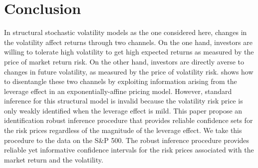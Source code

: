 \section{Conclusion}\label{sec:risk_conclusion}


In structural stochastic volatility models as the one considered here, changes in the volatility affect returns through two channels. On the one hand, investors are willing to tolerate high volatility to get high expected returns as measured by the price of market return risk. On the other hand, investors are directly averse to changes in future volatility, as measured by the price of volatility risk. \Textcite{han2018leverage} shows how to disentangle these two channels by exploiting information arising from the leverage effect in an exponentially-affine pricing model. However, standard inference for this structural model is invalid because the volatility risk price is only weakly identified when the leverage effect is mild. This paper propose an identification robust inference procedure that provides reliable confidence sets for the risk prices regardless of the magnitude of the leverage effect. We take this procedure to the data on the S\&P 500. The robust inference procedure provides reliable yet informative confidence intervals for the risk prices associated with the market return and the volatility. 




